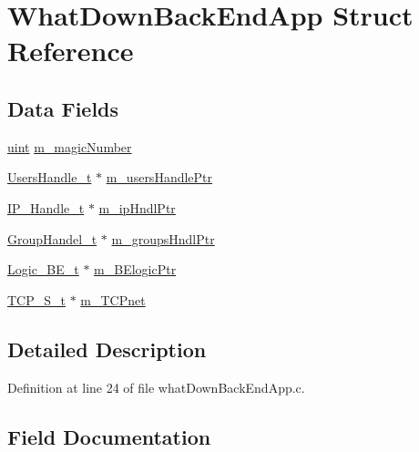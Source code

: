 \hypertarget{structWhatDownBackEndApp}{}\section{What\+Down\+Back\+End\+App Struct Reference}
\label{structWhatDownBackEndApp}
\subsection*{Data Fields}
\begin{DoxyCompactItemize}
\item 
\hyperlink{tcp_8h_a91ad9478d81a7aaf2593e8d9c3d06a14}{uint} \hyperlink{structWhatDownBackEndApp_a42c045ac45fba24457ecc2bed6b72551}{m\+\_\+magic\+Number}
\item 
\hyperlink{usersHandle_8h_a3185303d46556091db52fa6b9aae87cc}{Users\+Handle\+\_\+t} $\ast$ \hyperlink{structWhatDownBackEndApp_a1bada8187c9d6d2eb1d9d782a0e36970}{m\+\_\+users\+Handle\+Ptr}
\item 
\hyperlink{ipHandle_8h_add91812b3634709f7dfe7d00713c83d1}{I\+P\+\_\+\+Handle\+\_\+t} $\ast$ \hyperlink{structWhatDownBackEndApp_a34f5abe32cd1b0ab718376ab68c8d457}{m\+\_\+ip\+Hndl\+Ptr}
\item 
\hyperlink{groupsHandle_8h_a7763a5cfe578f64684989a97379e4899}{Group\+Handel\+\_\+t} $\ast$ \hyperlink{structWhatDownBackEndApp_ac5da91e05de138dceaba6b9c71c29bae}{m\+\_\+groups\+Hndl\+Ptr}
\item 
\hyperlink{logic__backEnd_8h_a3d470643313450e901076473552495b6}{Logic\+\_\+\+B\+E\+\_\+t} $\ast$ \hyperlink{structWhatDownBackEndApp_a4ea6f6682366eb894b19ba64aa40eb3b}{m\+\_\+\+B\+Elogic\+Ptr}
\item 
\hyperlink{tcp_8h_a03d44ed4c82d8938cc484f7d14284b24}{T\+C\+P\+\_\+\+S\+\_\+t} $\ast$ \hyperlink{structWhatDownBackEndApp_a31b8ae63bb41f8e6b231ddda0e67f612}{m\+\_\+\+T\+C\+Pnet}
\end{DoxyCompactItemize}


\subsection{Detailed Description}


Definition at line 24 of file what\+Down\+Back\+End\+App.\+c.



\subsection{Field Documentation}

